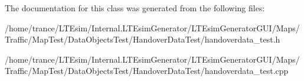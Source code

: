 The documentation for this class was generated from the following files\+:\begin{DoxyCompactItemize}
\item 
/home/trance/\+L\+T\+Esim/\+Internal.\+L\+T\+Esim\+Generator/\+L\+T\+Esim\+Generator\+G\+U\+I/\+Maps/\+Traffic/\+Map\+Test/\+Data\+Objects\+Test/\+Handover\+Data\+Test/handoverdata\+\_\+test.\+h\item 
/home/trance/\+L\+T\+Esim/\+Internal.\+L\+T\+Esim\+Generator/\+L\+T\+Esim\+Generator\+G\+U\+I/\+Maps/\+Traffic/\+Map\+Test/\+Data\+Objects\+Test/\+Handover\+Data\+Test/handoverdata\+\_\+test.\+cpp\end{DoxyCompactItemize}
